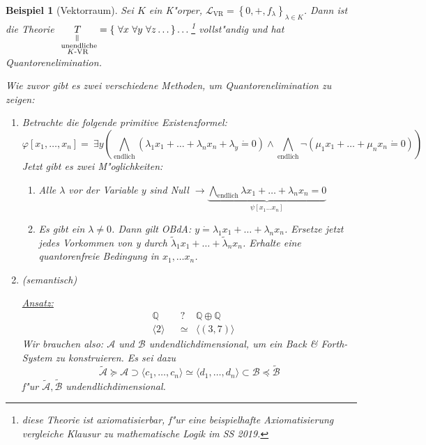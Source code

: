 \documentclass[a4paper,12pt,numbers=noenddot,parskip=full]{scrartcl}
\newcommand{\setQ}{\mathbb{Q}}
\newcommand{\Forall}{~\forall}
\newcommand{\Exists}{~\exists}
\newcommand{\scrL}{\mathcal{L}}
\newcommand{\scrA}{\mathcal{A}}
\newcommand{\scrB}{\mathcal{B}}
\theoremstyle{dotless}
\newtheorem{example}[theorem]{Beispiel}
\begin{document}
\begin{example}[Vektorraum]
	Sei $K$ ein K"orper, $\scrL_\text{VR} = \left\{0, +, f_\lambda \right\}_{\lambda \in K}$. Dann ist die Theorie $\underset{\substack{\rotatebox{90}{$=$} \\ \text{ unendliche}\\ K\text{-VR}}}{T} = \{\Forall x \Forall y \Forall z \dots \} \dots$\footnote{diese Theorie ist axiomatisierbar, f"ur eine beispielhafte Axiomatisierung vergleiche Klausur zu mathematische Logik im SS 2019.} vollst"andig und hat Quantorenelimination.
	
	Wie zuvor gibt es zwei verschiedene Methoden, um Quantorenelimination zu zeigen:
	\begin{enumerate}
		\item Betrachte die folgende primitive Existenzformel: 
		\begin{equation*}
			\varphi[x_1, \dots, x_n] = \Exists y \left( \bigwedge\limits_{\text{endlich}} \left(\lambda_1 x_1 + \dots + \lambda_n x_n + \lambda_y \dot= 0\right) \land \bigwedge\limits_{\text{endlich}} \lnot \left(\mu_1 x_1 + \dots + \mu_n x_n \dot= 0\right)\right)
		\end{equation*}
		Jetzt gibt es zwei M"oglichkeiten:
		\begin{enumerate}
			\item \emph{Alle $\lambda$ vor der Variable $y$ sind Null} $\rightarrow \underbrace{\bigwedge\limits_{\text{endlich}} \lambda x_1 + \dots + \lambda_n x_n = 0}_{\psi[x_1 \dots x_n]}$
			
			\item \emph{Es gibt ein $\lambda \neq 0$}. Dann gilt OBdA: $y \dot= \lambda_1 x_1 + \dots + \lambda_n x_n$. Ersetze jetzt jedes Vorkommen von y durch $\tilde{\lambda}_1 x_1 + \dots + \tilde{\lambda}_n x_n$. Erhalte eine quantorenfreie Bedingung in $x_1, \dots x_n$.
		\end{enumerate}
		
		\item (semantisch)
		
		\underline{Ansatz:} \begin{align*}
			&\setQ &&? &\setQ \oplus \setQ \\
			&\langle 2 \rangle &&\simeq &\langle (3,7) \rangle
		\end{align*}
		Wir brauchen also: $\scrA$ und $\scrB$ undendlichdimensional, um ein Back \& Forth-System zu konstruieren. Es sei dazu
		\begin{equation*}
			\tilde{\scrA} \succeq \scrA \supset \langle c_1, \dots, c_n \rangle \simeq \langle d_1, \dots , d_n \rangle \subset \scrB \preceq \tilde{\scrB}
		\end{equation*}
		f"ur $\tilde{\scrA}, \tilde{\scrB}$ undendlichdimensional.
		

\end{enumerate}
\end{example}
\end{document}

